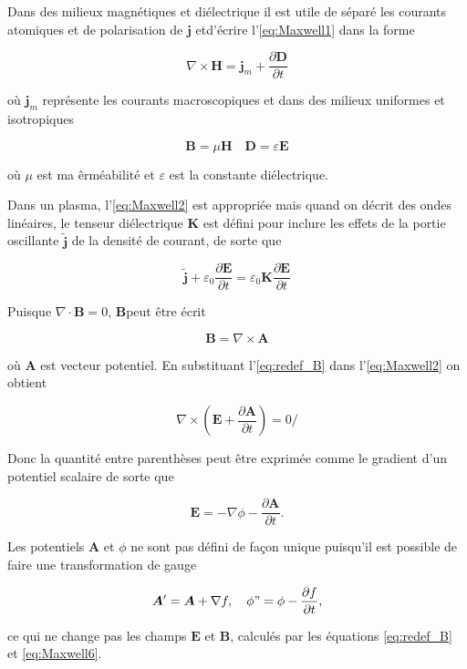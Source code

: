 \documentclass[main.tex]{subfiles}
\begin{document}
Dans des milieux magnétiques et diélectrique il est utile de séparé les courants atomiques et de polarisation de \( \bm{j} \) etd'écrire l'\autoref{eq:Maxwell1} dans la forme

\[
	\nabla \times \bm{H} = \bm{j}_m + \frac{\partial \bm{D}}{\partial t}
\]

\noindent où \( \bm{j}_m \) représente les courants macroscopiques et dans des milieux uniformes et isotropiques

\[
	\bm{B} = \mu\bm{H} \quad \bm{D} = \varepsilon\bm{E}
\]

\noindent où \( \mu \) est ma êrméabilité et \( \varepsilon \) est la constante diélectrique.

Dans un plasma, l'\autoref{eq:Maxwell2} est appropriée mais  quand on décrit des ondes linéaires, le tenseur diélectrique \( \bm{K} \) est défini pour inclure les effets de la portie oscillante \( \tilde{\bm{j}} \) de la densité de courant, de sorte que

\[
	\tilde{\bm{j}} + \varepsilon_0 \frac{\partial \bm{E}}{\partial t} = \varepsilon_0 \bm{K} \frac{\partial \bm{E}}{\partial t}
\]

Puisque \( \nabla \cdot \bm{B} = 0 \), \( \bm{B} \)peut être écrit

\begin{equation}
	\bm{B} = \nabla \times \bm{A}
	\label{eq:redef_B}
\end{equation}

\noindent où \( \bm{A} \) est vecteur potentiel.
En substituant l'\autoref{eq:redef_B} dans l'\autoref{eq:Maxwell2} on obtient

\[
	\nabla \times \left( \bm{E} + \frac{\partial \bm{A}}{\partial t} \right) = 0/
\]

\noindent Donc la quantité entre parenthèses peut être exprimée comme le gradient d'un potentiel scalaire de sorte que

\begin{equation}
	\bm{E} = - \nabla \phi - \frac{\partial \bm{A}}{\partial t}.
	\label{eq:Maxwell6}
\end{equation}

\noindent Les potentiels \( \bm{A} \) et \( \phi \) ne sont pas défini de façon unique puisqu'il est possible de faire une transformation de gauge

\[
	\bm{A}' = \bm{A} + \nabla f, \quad \phi" = \phi - \frac{\partial f}{\partial t},
\]

\noindent ce qui ne change pas les champs \( \bm{E} \) et \( \bm{B} \), calculés par les équations \ref{eq:redef_B} et \ref{eq:Maxwell6}.
\end{document}
